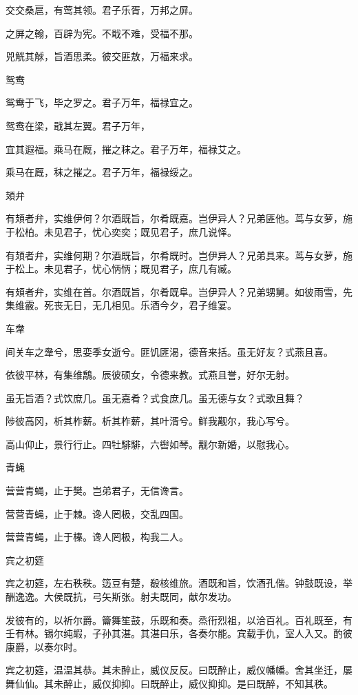 交交桑扈，有莺其领。君子乐胥，万邦之屏。

之屏之翰，百辟为宪。不戢不难，受福不那。

兕觥其觩，旨酒思柔。彼交匪敖，万福来求。

鸳鸯

鸳鸯于飞，毕之罗之。君子万年，福禄宜之。

鸳鸯在梁，戢其左翼。君子万年，

宜其遐福。乘马在厩，摧之秣之。君子万年，福禄艾之。

乘马在厩，秣之摧之。君子万年，福禄绥之。

頍弁

有頍者弁，实维伊何？尔酒既旨，尔肴既嘉。岂伊异人？兄弟匪他。茑与女萝，施于松柏。未见君子，忧心奕奕；既见君子，庶几说怿。

有頍者弁，实维何期？尔酒既旨，尔肴既时。岂伊异人？兄弟具来。茑与女萝，施于松上。未见君子，忧心怲怲；既见君子，庶几有臧。

有頍者弁，实维在首。尔酒既旨，尔肴既阜。岂伊异人？兄弟甥舅。如彼雨雪，先集维霰。死丧无日，无几相见。乐酒今夕，君子维宴。

车舝

间关车之舝兮，思娈季女逝兮。匪饥匪渴，德音来括。虽无好友？式燕且喜。

依彼平林，有集维鷮。辰彼硕女，令德来教。式燕且誉，好尔无射。

虽无旨酒？式饮庶几。虽无嘉肴？式食庶几。虽无德与女？式歌且舞？

陟彼高冈，析其柞薪。析其柞薪，其叶湑兮。鲜我觏尔，我心写兮。

高山仰止，景行行止。四牡騑騑，六辔如琴。觏尔新婚，以慰我心。

青蝇

营营青蝇，止于樊。岂弟君子，无信谗言。

营营青蝇，止于棘。谗人罔极，交乱四国。

营营青蝇，止于榛。谗人罔极，构我二人。

宾之初筵

宾之初筵，左右秩秩。笾豆有楚，殽核维旅。酒既和旨，饮酒孔偕。钟鼓既设，举酬逸逸。大侯既抗，弓矢斯张。射夫既同，献尔发功。

发彼有的，以祈尔爵。籥舞笙鼓，乐既和奏。烝衎烈祖，以洽百礼。百礼既至，有壬有林。锡尔纯嘏，子孙其湛。其湛曰乐，各奏尔能。宾载手仇，室人入又。酌彼康爵，以奏尔时。

宾之初筵，温温其恭。其未醉止，威仪反反。曰既醉止，威仪幡幡。舍其坐迁，屡舞仙仙。其未醉止，威仪抑抑。曰既醉止，威仪抑抑。是曰既醉，不知其秩。

